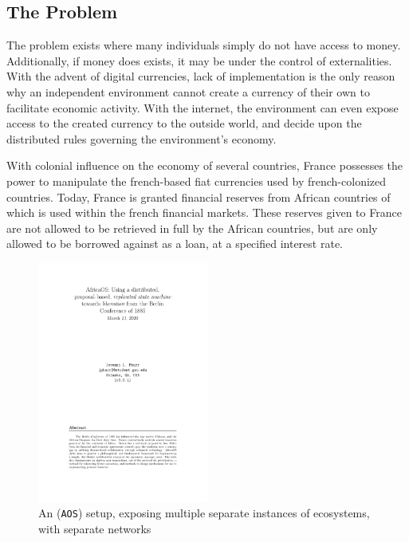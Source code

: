 \documentclass[10pt, titlepage, twocolumn]{report}
\begin{document}
\subsection{The Problem}
\hspace*{15pt}
The problem exists where many individuals simply do not have access to money. Additionally, if money does exists, it may be under the control of externalities. With the advent of digital currencies, lack of implementation is the only reason why an independent environment cannot create a currency of their own to facilitate economic activity. With the internet, the environment can even expose access to the created currency to the outside world, and decide upon the distributed rules governing the environment's economy. 

\hspace*{15pt}
With colonial influence on the economy of several countries, France possesses the power to manipulate the french-based fiat currencies used by french-colonized countries. Today, France is granted financial reserves from African countries of which is used within the french financial markets. These reserves given to France are not allowed to be retrieved in full by the African countries, but are only allowed to be borrowed against as a loan, at a specified interest rate.


\begin{figure}[ht]
\centering
	\includegraphics[width=0.5\textwidth]{aos}
	\caption{An (\texttt{AOS}) setup, exposing multiple separate instances of ecosystems, with separate networks}
	\label{aos}
\end{figure}
\end{document}
